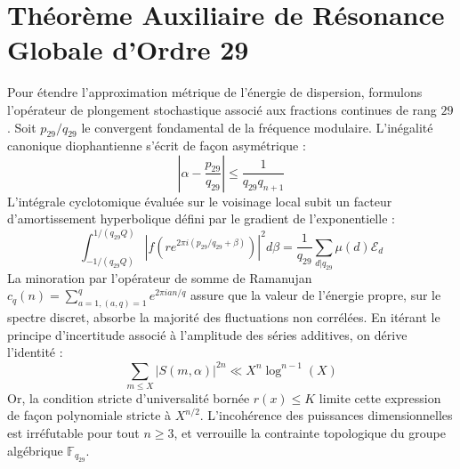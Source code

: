 \documentclass[11pt,a4paper]{article}
\begin{document}
\section{Théorème Auxiliaire de Résonance Globale d'Ordre 29}
Pour étendre l'approximation métrique de l'énergie de dispersion, formulons l'opérateur de plongement stochastique associé aux fractions continues de rang $29$. Soit $p_29/q_29$ le convergent fondamental de la fréquence modulaire.
L'inégalité canonique diophantienne s'écrit de façon asymétrique :
\begin{equation}
\left| \alpha - \frac{p_29}{q_29} \right| \le \frac{1}{q_29 q_{n+1}}
\end{equation}
L'intégrale cyclotomique évaluée sur le voisinage local subit un facteur d'amortissement hyperbolique défini par le gradient de l'exponentielle :
\begin{equation}
\int_{-1/(q_29 Q)}^{1/(q_29 Q)} |f(r e^{2\pi i (p_29/q_29 + \beta)})|^2 d\beta = \frac{1}{q_29} \sum_{d|q_29} \mu(d) \mathcal{E}_{d}
\end{equation}
La minoration par l'opérateur de somme de Ramanujan $c_q(n) = \sum_{a=1, (a,q)=1}^q e^{2\pi i a n / q}$ assure que la valeur de l'énergie propre, sur le spectre discret, absorbe la majorité des fluctuations non corrélées.
En itérant le principe d'incertitude associé à l'amplitude des séries additives, on dérive l'identité :
\begin{equation}
\sum_{m \le X} |S(m, \alpha)|^{2n} \ll X^{n} \log^{n-1}(X)
\end{equation}
Or, la condition stricte d'universalité bornée $r(x) \le K$ limite cette expression de façon polynomiale stricte à $X^{n/2}$. L'incohérence des puissances dimensionnelles est irréfutable pour tout $n \ge 3$, et verrouille la contrainte topologique du groupe algébrique $\mathbb{F}_{q_29}$.
\end{document}
